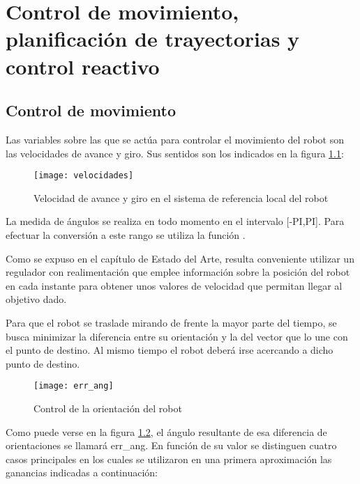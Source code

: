 
\chapter{Control de movimiento, planificación de trayectorias y control reactivo}

\section{Control de movimiento}\label{control}

Las variables sobre las que se actúa para controlar el movimiento del robot son las velocidades de avance y giro. Sus sentidos son los indicados en la figura \ref{fg:velocidades}:

\begin{figure}[hbt]
  \centering\texttt{[image: velocidades]}\\
  \caption{Velocidad de avance y giro en el sistema de referencia local del robot}\label{fg:velocidades}
\end{figure}


La medida de ángulos se realiza en todo momento en el intervalo [-PI,PI]. Para efectuar la conversión a este rango se utiliza la función .

Como se expuso en el capítulo de Estado del Arte, resulta conveniente utilizar un regulador con realimentación que emplee información sobre la posición del robot en cada instante para obtener unos valores de velocidad que permitan llegar al objetivo dado.

Para que el robot se traslade mirando de frente la mayor parte del tiempo, se busca minimizar la diferencia entre su orientación y la del vector que lo une con el punto de destino. Al mismo tiempo el robot deberá irse acercando a dicho punto de destino.

\begin{figure}[hbt]
  \centering\texttt{[image: err\_ang]}\\
  \caption{Control de la orientación del robot}\label{fg:err_ang}
\end{figure}

Como puede verse en la figura \ref{fg:err_ang}, el ángulo resultante de esa diferencia de orientaciones se llamará err\_ang. En función de su valor se distinguen cuatro casos principales en los cuales se utilizaron en una primera aproximación las ganancias indicadas a continuación:

